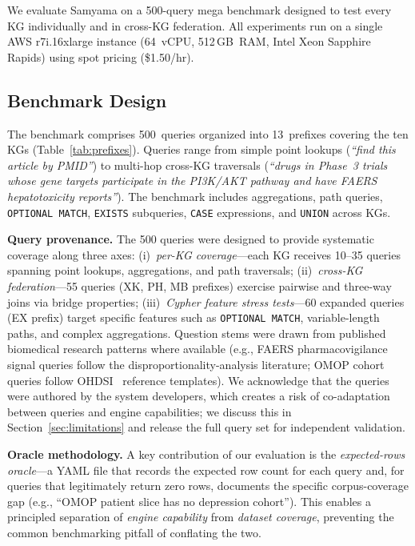 \documentclass[runningheads]{llncs}
\begin{document}
We evaluate Samyama on a 500-query mega benchmark designed to test
every KG individually and in cross-KG federation.  All experiments
run on a single AWS r7i.16xlarge instance (64~vCPU, 512\,GB~RAM,
Intel Xeon Sapphire Rapids) using spot pricing (\$1.50/hr).

\subsection{Benchmark Design}

The benchmark comprises 500~queries organized into 13~prefixes
covering the ten KGs (Table~\ref{tab:prefixes}).  Queries range
from simple point lookups (\emph{``find this article by PMID''})
to multi-hop cross-KG traversals (\emph{``drugs in Phase~3 trials
whose gene targets participate in the PI3K/AKT pathway and have
FAERS hepatotoxicity reports''}).  The benchmark includes
aggregations, path queries, \texttt{OPTIONAL MATCH},
\texttt{EXISTS} subqueries, \texttt{CASE} expressions, and
\texttt{UNION} across KGs.

\smallskip\noindent\textbf{Query provenance.}
The 500 queries were designed to provide systematic coverage along
three axes: (i)~\emph{per-KG coverage}---each KG receives 10--35
queries spanning point lookups, aggregations, and path traversals;
(ii)~\emph{cross-KG federation}---55 queries (XK, PH, MB prefixes)
exercise pairwise and three-way joins via bridge properties;
(iii)~\emph{Cypher feature stress tests}---60 expanded queries (EX
prefix) target specific features such as \texttt{OPTIONAL MATCH},
variable-length paths, and complex aggregations.  Question stems
were drawn from published biomedical research patterns where
available (e.g., FAERS pharmacovigilance signal queries follow the
disproportionality-analysis literature; OMOP cohort queries follow
OHDSI~\cite{hripcsak2015omop} reference templates).
We acknowledge that the queries were authored by the system
developers, which creates a risk of co-adaptation between queries
and engine capabilities; we discuss this in
Section~\ref{sec:limitations} and release the full query set for
independent validation.

\smallskip\noindent\textbf{Oracle methodology.}
A key contribution of our evaluation is the \emph{expected-rows
oracle}---a YAML file that records the expected row count for each
query and, for queries that legitimately return zero rows,
documents the specific corpus-coverage gap (e.g., ``OMOP patient
slice has no depression cohort'').  This enables a principled
separation of \emph{engine capability} from \emph{dataset coverage},
preventing the common benchmarking pitfall of conflating the two.
\end{document}
